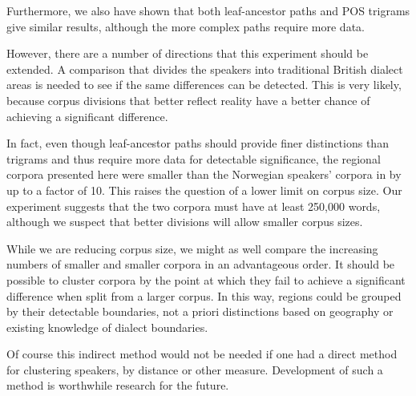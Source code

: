 \documentclass[11pt,letterpaper]{article}
\begin{document}
Furthermore, we also have shown that both leaf-ancestor paths and POS
trigrams give similar results, although the more complex paths require more data.

However, there are a number of directions that this experiment should
be extended. A comparison that divides the speakers into traditional
British dialect areas is needed to see if the same differences can be
detected. This is very likely, because corpus divisions that better
reflect reality have a better chance of achieving a significant difference.

In fact, even though leaf-ancestor paths should provide finer
distinctions than trigrams and thus require more data for detectable
significance, the regional corpora presented here were smaller than
the Norwegian speakers' corpora in  by up to a factor of
10. This raises the question of a lower limit on corpus size. Our
experiment suggests that the two corpora must have at least 250,000 words,
although we suspect that better divisions will allow smaller corpus sizes.

While we are reducing corpus size, we might as well compare the
increasing numbers of smaller and smaller corpora in an advantageous
order. It should be possible to cluster corpora by the point at which
they fail to achieve a significant difference when split from a
larger corpus. In this way, regions could be
grouped by their detectable boundaries, not a priori distinctions
based on geography or existing knowledge of dialect boundaries.

Of course this indirect method would not be needed if one had a direct
method for clustering speakers, by distance or other
measure. Development of such a method is worthwhile research for the future.




\end{document}
